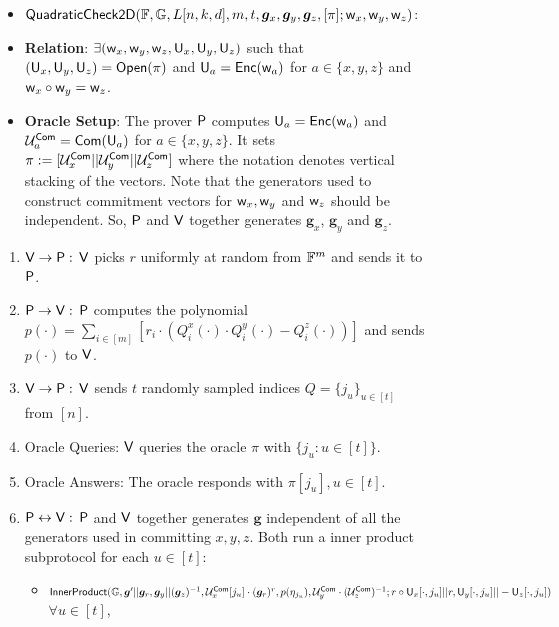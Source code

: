 \begin{figure}[h!]
\centering
\begin{framed}
	\begin{itemize}
		\item {$\mathsf{QuadraticCheck2D} (\mathbb{F}, \mathbb{G}, L[n,k,d], m, t, \bm{g}_x, \bm{g}_y, \bm{g}_z, [\pi]; \mathsf{w}_x, \mathsf{w}_y, \mathsf{w}_z)$}:
		\item {\bf Relation}: $\exists (\mathsf{w}_x, \mathsf{w}_y, \mathsf{w}_z, \mathsf{U}_x, \mathsf{U}_y, \mathsf{U}_z)$ such that $(\mathsf{U}_x, \mathsf{U}_y, \mathsf{U}_z) = \mathsf{Open}(\pi)$ and $\mathsf{U}_a = \mathsf{Enc}(\mathsf{w}_a)$ for $a\in \{x,y,z\}$ and $\mathsf{w}_x \circ \mathsf{w}_y = \mathsf{w}_z$.
		\item {\bf Oracle Setup}: The prover $\mathsf{P}$ computes $\mathsf{U}_a = \mathsf{Enc}(\mathsf{w}_a)$ and $\mathcal{U}^{\mathsf{Com}}_a = \mathsf{Com}(\mathsf{U}_a)$ for $a\in \{x,y,z\}$. It sets $\pi := [\mathcal{U}^{\mathsf{Com}}_{x} || \mathcal{U}^{\mathsf{Com}}_{y} || \mathcal{U}^{\mathsf{Com}}_{z}]$ where the notation denotes vertical stacking of the vectors. Note that the generators used to construct commitment vectors for $\mathsf{w}_x, \mathsf{w}_y$ and $\mathsf{w}_z$ should be independent. So, $\mathsf{P}$ and $\mathsf{V}$ together generates $\bm{g}_x$, $\bm{g}_y$ and $\bm{g}_z$.
	\end{itemize}
\begin{enumerate}
	\item $\mathsf{V} \rightarrow \mathsf{P}: $ $\mathsf{V}$ picks $r$ uniformly at random from $\mathbb{F}^{m}$ and sends it to $\mathsf{P}$.
	
	\item $\mathsf{P} \rightarrow \mathsf{V}: $ $\mathsf{P}$ computes the polynomial $p(\cdot)= \sum_{i\in [m]} [r_i\cdot (Q^x_i(\cdot)\cdot Q^y_i(\cdot) - Q^z_i(\cdot))] $ and sends $p(\cdot)$ to $\mathsf{V}$. 
	
	\item $\mathsf{V} \rightarrow \mathsf{P}: $ $\mathsf{V}$ sends $t$ randomly sampled indices $Q=\{j_u\}_{u\in[t]}$ from $[n]$.
	
	\item Oracle Queries: $\mathsf{V}$ queries the oracle $\pi$ with $\{j_u : u\in [t]\}$.
	\item Oracle Answers: The oracle responds with $\pi[j_u], u\in[t]$.
	\item $\mathsf{P} \leftrightarrow \mathsf{V}: $ $\mathsf{P}$ and $\mathsf{V}$ together generates $\bm{g}$ independent of all the generators used in committing $x,y,z$. Both run a inner product subprotocol for each $u\in[t]$:
	\begin{itemize}
		\item $\mathsf{InnerProduct}(\mathbb{G},\bm{g}'||\bm{g}_r, \bm{g}_y||(\bm{g}_z)^{-1}, \mathcal{U}^{\mathsf{Com}}_x[j_u]\cdot (\bm{g}_r)^r, p(\eta_{j_u}), \mathcal{U}^{\mathsf{Com}}_y\cdot (\mathcal{U}^{\mathsf{Com}}_z)^{-1}; r\circ\mathsf{U}_x[\cdot,j_u]||r, \mathsf{U}_y[\cdot,j_u]||-\mathsf{U}_z[\cdot,j_u])$ $\forall u\in [t]$,
		

\end{itemize}
\end{enumerate}
\end{framed}
\end{figure}
